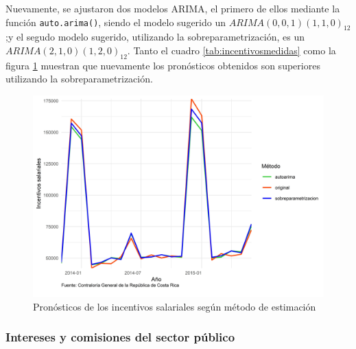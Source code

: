 \documentclass[
]{article}
\begin{document}
Nuevamente, se ajustaron dos modelos ARIMA, el primero de ellos mediante
la función \texttt{auto.arima()}, siendo el modelo sugerido un
\(ARIMA(0,0,1)(1,1,0)_{12}\);y el segudo modelo sugerido, utilizando la
sobreparametrización, es un \(ARIMA(2,1,0)(1,2,0)_{12}\). Tanto el
cuadro \ref{tab:incentivosmedidas} como la figura
\ref{fig:incentivosplotpronostico} muestran que nuevamente los
pronósticos obtenidos son superiores utilizando la sobreparametrización.

\begin{table}[!h]

\caption{\label{tab:unnamed-chunk-20}\label{tab:incentivosmedidas}Medidas de rendimiento según método de estimación para los incentivos salariales}
\centering
{}
\end{table}

\begin{figure}[!h]
\includegraphics[width=1\linewidth,height=1\textheight]{Tesis_files/figure-latex/incentivosplotpronostico-1} \caption{Pronósticos de los incentivos salariales según método de estimación}\label{fig:incentivosplotpronostico}
\end{figure}

\subsubsection{Intereses y comisiones del sector público}
\end{document}
